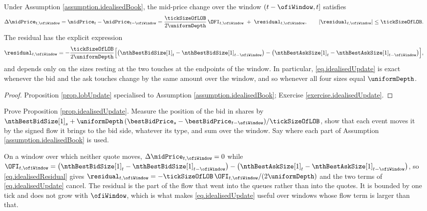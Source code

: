 \begin{prop}\label{prop.idealisedUpdate}
 Under Assumption \ref{assumption.idealisedBook},
 the mid-price change over the window $(t-\ofiWindow,t]$ satisfies
 \begin{equation}\label{eq.idealisedUpdate}
  \Delta \midPrice_{t,\ofiWindow}
  = \midPrice_{t} - \midPrice_{t-\ofiWindow}
  = \frac{\tickSizeOfLOB}{2\uniformDepth} \, \OFI_{t,\ofiWindow}
  \; + \; \residual_{t,\ofiWindow},
  \qquad
  \vert \residual_{t,\ofiWindow} \vert \leq \tickSizeOfLOB .
 \end{equation}
 The residual has the explicit expression
 \begin{equation}\label{eq.idealisedResidual}
  \residual_{t,\ofiWindow}
  = -\frac{\tickSizeOfLOB}{2\uniformDepth}\Big[
  \big( \nthBestBidSize[1]_{t} - \nthBestBidSize[1]_{t-\ofiWindow} \big)
  - \big( \nthBestAskSize[1]_{t} - \nthBestAskSize[1]_{t-\ofiWindow} \big) \Big],
 \end{equation}
 and depends only on the sizes resting at the two touches at the endpoints of the window.
 In particular, \eqref{eq.idealisedUpdate} is exact whenever the bid and the ask touches
 change by the same amount over the window, and so whenever all four sizes equal
 $\uniformDepth$.
\end{prop}
\begin{proof}
 Proposition \ref{prop.lobUpdate} specialised to
 Assumption \ref{assumption.idealisedBook}; Exercise \ref{exercise.idealisedUpdate}.
\end{proof}

\begin{exercise}\label{exercise.idealisedUpdate}
 Prove Proposition \ref{prop.idealisedUpdate}.
 Measure the position of the bid in shares by
 $\nthBestBidSize[1]_{s}
 + \uniformDepth\,(\bestBidPrice_{s} - \bestBidPrice_{t-\ofiWindow})/\tickSizeOfLOB$,
 show that each event moves it by the signed flow it brings to the bid side,
 whatever its type,
 and sum over the window.
 Say where each part of Assumption \ref{assumption.idealisedBook} is used.
\end{exercise}

\begin{remark}\label{remark.residualIsQueueFlow}
 On a window over which neither quote moves,
 $\Delta\midPrice_{t,\ofiWindow} = 0$ while
 $\OFI_{t,\ofiWindow}
 = \big(\nthBestBidSize[1]_{t} - \nthBestBidSize[1]_{t-\ofiWindow}\big)
 - \big(\nthBestAskSize[1]_{t} - \nthBestAskSize[1]_{t-\ofiWindow}\big)$,
 so \eqref{eq.idealisedResidual} gives
 $\residual_{t,\ofiWindow}
 = -\tickSizeOfLOB\,\OFI_{t,\ofiWindow}/(2\uniformDepth)$
 and the two terms of \eqref{eq.idealisedUpdate} cancel.
 The residual is the part of the flow that went into the queues rather than into the quotes.
 It is bounded by one tick and does not grow with $\ofiWindow$,
 which is what makes \eqref{eq.idealisedUpdate} useful over windows
 whose flow term is larger than that.
\end{remark}

